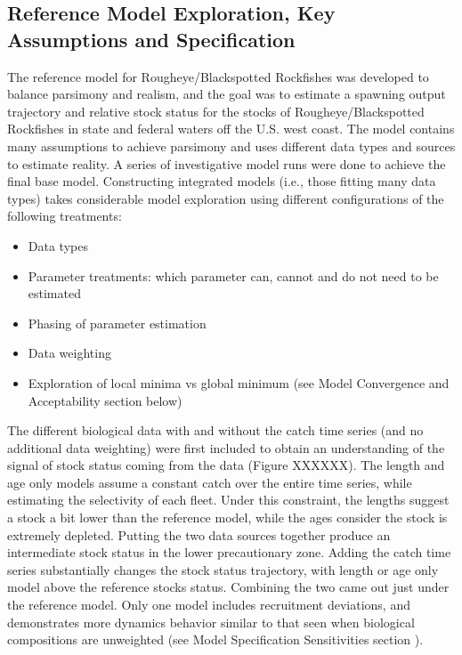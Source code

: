 \documentclass[
]{scrartcl}
\providecommand{\tightlist}{%
  \setlength{\itemsep}{0pt}\setlength{\parskip}{0pt}}\usepackage{longtable,booktabs,array}
\begin{document}
\subsection{Reference Model Exploration, Key Assumptions and
Specification}\label{reference-model-exploration-key-assumptions-and-specification}

The reference model for Rougheye/Blackspotted Rockfishes was developed
to balance parsimony and realism, and the goal was to estimate a
spawning output trajectory and relative stock status for the stocks of
Rougheye/Blackspotted Rockfishes in state and federal waters off the
U.S. west coast. The model contains many assumptions to achieve
parsimony and uses different data types and sources to estimate reality.
A series of investigative model runs were done to achieve the final base
model. Constructing integrated models (i.e., those fitting many data
types) takes considerable model exploration using different
configurations of the following treatments:

\begin{itemize}
\tightlist
\item
  Data types
\item
  Parameter treatments: which parameter can, cannot and do not need to
  be estimated
\item
  Phasing of parameter estimation
\item
  Data weighting
\item
  Exploration of local minima vs global minimum (see Model Convergence
  and Acceptability section below)
\end{itemize}

The different biological data with and without the catch time series
(and no additional data weighting) were first included to obtain an
understanding of the signal of stock status coming from the data (Figure
XXXXXX). The length and age only models assume a constant catch over the
entire time series, while estimating the selectivity of each fleet.
Under this constraint, the lengths suggest a stock a bit lower than the
reference model, while the ages consider the stock is extremely
depleted. Putting the two data sources together produce an intermediate
stock status in the lower precautionary zone. Adding the catch time
series substantially changes the stock status trajectory, with length or
age only model above the reference stocks status. Combining the two came
out just under the reference model. Only one model includes recruitment
deviations, and demonstrates more dynamics behavior similar to that seen
when biological compositions are unweighted (see Model Specification
Sensitivities section ).
\end{document}
